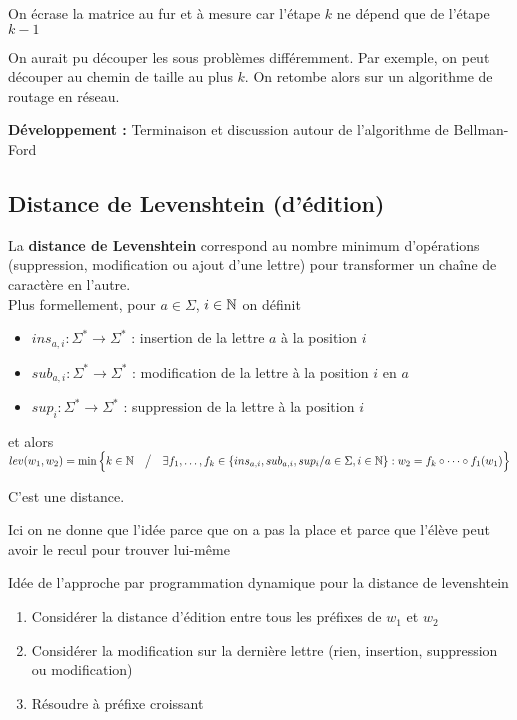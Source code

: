 \begin{rem}
	On écrase la matrice au fur et à mesure car l'étape $k$ ne dépend que de l'étape $k-1$
\end{rem}

\begin{rem}
	On aurait pu découper les sous problèmes différemment. Par exemple, on peut découper au chemin de taille au plus $k$. On retombe alors sur un algorithme de routage en réseau.
\end{rem}

\textbf{Développement :} Terminaison et discussion autour de l'algorithme de Bellman-Ford

\subsection{Distance de Levenshtein (d'édition)}

\begin{definition}
	La \textbf{distance de Levenshtein} correspond au nombre minimum d'opérations (suppression, modification ou ajout d'une lettre) pour transformer un chaîne de caractère en l'autre.\\
	
	Plus formellement, pour $a \in \Sigma$, $i \in \mathbb{N}$ on définit
	\begin{itemize}[label=$\star$]
		\item $ins_{a, i} : \Sigma^* \to \Sigma^*$ : insertion de la lettre $a$ à la position $i$
		\item $sub_{a, i} : \Sigma^* \to \Sigma^*$ : modification de la lettre à la position $i$ en $a$
		\item $sup_{i} : \Sigma^* \to \Sigma^*$ : suppression de la lettre à la position $i$
	\end{itemize}
	et alors $lev(w_1, w_2) = \min\Big\{ k \in \mathbb{N} \quad \big/ \quad \exists f_1, \dots, f_k \in \{ins_{a,i}, sub_{a,i}, sup_i / a\in \Sigma, i \in \mathbb{N} \} : w_2 = f_k \circ \dots \circ f_1 (w_1) \Big\}$ 
\end{definition}

\begin{exercise}
	C'est une distance.
\end{exercise}

\begin{com}
	Ici on ne donne que l'idée parce que on a pas la place et parce que l'élève peut avoir le recul pour trouver lui-même
\end{com}
\begin{algo}
	Idée de l'approche par programmation dynamique pour la distance de levenshtein
	\begin{enumerate}
		\item Considérer la distance d'édition entre tous les préfixes de $w_1$ et $w_2$
		\item Considérer la modification sur la dernière lettre (rien, insertion, suppression ou modification)
		\item Résoudre à préfixe croissant
	\end{enumerate}
\end{algo}